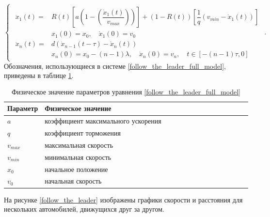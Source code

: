 \documentclass[12pt, a4paper]{extarticle}
\numberwithin{equation}{section}
\begin{document}
\begin{equation} \label{follow_the_leader_full_model}
\begin{cases}
\begin{split}
\ddot{x}_{1}(t) = &R(t) \left[ a\left( 1-\left( \dfrac{\dot{x}_{1}(t)}{v_{max}}\right) \right)\right] + (1-R(t))\left[  \dfrac{1}{q}\left( v_{min} - \dot{x}_{1}(t)\right) \right]  \\
&x_{1}(0)=x_0, \quad \dot{x}_{1}(0)=v_{0}\\
\ddot{x}_{n}(t) = &d(\dot{x}_{n-1}(t-\tau)-\dot{x}_{n}(t)) \\
&x_n(0)=x_0-(n-1)\lambda, \quad \dot{x}_n(0)=v_{n}, \quad t \in [-(n-1)\tau,0]
\end{split}
\end{cases}.
\end{equation}
Обозначения, использующиеся в системе \eqref{follow_the_leader_full_model}, приведены в таблице \ref{follow_the_leader_full_model_parameters}.
\begin{table}[h!]
	\caption{Физическое значение параметров уравнения \eqref{follow_the_leader_full_model}}
	\label{follow_the_leader_full_model_parameters}
	\begin{center}
		\begin{tabularx}{\textwidth}{p{0.15\linewidth}p{0.85\linewidth}}			
			\hline
			\rule{0cm}{0,5cm}
			Параметр &  Физическое значение \\ 
			[3pt]\hline
			$a$ & коэффициент максимального ускорения\\
			$q$ & коэффициент торможения\\ 
			$v_{max}$ & максимальная скорость\\
			$v_{min}$ & минимальная скорость\\ 
			$x_0$ & начальное положение\\
			$v_0$ & начальная скорость\\ 
			\hline
		\end{tabularx}
	\end{center}
\end{table}


На рисунке \eqref{follow_the_leader} изображены графики скорости и расстояния для нескольких автомобилей, движущихся друг за другом.
\end{document}
